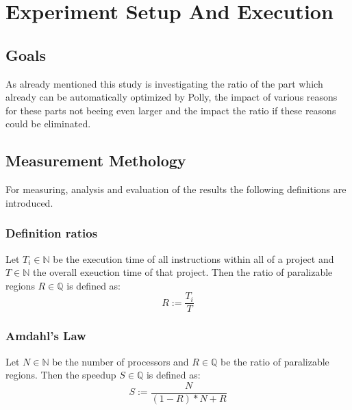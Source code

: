\chapter{Experiment Setup And Execution}
\section{Goals}
As already mentioned this study is investigating the ratio of the part which already can be automatically optimized by Polly, the impact of various reasons for these parts not beeing even larger and the impact the ratio if these reasons could be eliminated.

\section{Measurement Methology}
For measuring, analysis and evaluation of the results the following definitions are introduced.
\subsection{Definition ratios}
Let \(T_i\in\mathbb{N}\) be the execution time of all instructions within all \scops of a project and \(T\in\mathbb{N}\) the overall exeuction time of that project.
Then the ratio of paralizable regions \(R\in\mathbb{Q}\) is defined as:
\[R := \frac{T_i}{T}\]

\subsection[Amdahl's Law]{Amdahl's Law \cite{AmdahlsLaw}}
Let \(N\in\mathbb{N}\) be the number of processors and \(R\in\mathbb{Q}\) be the ratio of paralizable regions.
Then the speedup \(S\in\mathbb{Q}\) is defined as:
\[S := \frac{N}{(1-R)*N+R}\]
